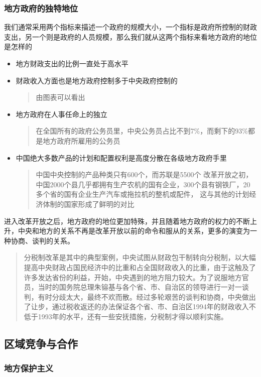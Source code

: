 \documentclass[11pt]{article}
\begin{document}
\subsubsection{地方政府的独特地位}
\label{sec:orgb65a654}
我们通常采用两个指标来描述一个政府的规模大小，一个指标是政府所控制的财政支出，另一个则是政府的人员规模，那么我们就从这两个指标来看地方政府的地位是怎样的
\begin{itemize}
\item 地方财政支出的比例一直处于高水平
\item 财政收入方面也是地方政府控制多于中央政府控制的
\begin{quote}
由图表可以看出
\end{quote}
\item 地方政府在人事任命上的独立
\begin{quote}
在全国所有的政府公务员里，中央公务员占比不到7\%，而剩下的93\%都是地方政府所雇用的公务员
\end{quote}
\item 中国绝大多数产品的计划和配置权利是高度分散在各级地方政府手里
\begin{quote}
中国中央控制的产品种类只有600个，而苏联是5500个
改革开放之初，中国2000个县几乎都拥有生产农机的国有企业，300个县有钢铁厂，20多个省的国有企业生产汽车或拖拉机的整机或配件，
这与其他的计划经济体制的国家形成了鲜明的对比
\end{quote}
\end{itemize}
进入改革开放之后，地方政府的地位更加特殊，并且随着地方政府的权力的不断上升，中央和地方的关系不再是改革开放以前的命令和服从的关系，更多的演变为一种协商、谈判的关系。
\begin{quote}
分税制改革是其中的典型案例，中央试图从财政包干制转向分税制，以大幅提高中央财政占国民经济中的比重和占全国财政收入的比重，由于这触及了许多发达省份的利益，开始，中央遇到的地方阻力较大。为了说服地方官员，当时的国务院总理朱镕基与各个省、市、自治区的领导进行一对一谈判，有时分歧太大，最终不欢而散。经过多轮艰苦的谈判和协商，中央做出了让步，通过税收返还的办法保证各个省、市、自治区1994年的财政收入不低于1993年的水平，还有一些安抚措施，分税制才得以顺利实施。
\end{quote}
\subsection{区域竞争与合作}
\label{sec:orgaf5b7e7}
\subsubsection{地方保护主义}
\label{sec:org904beab}
\end{document}
